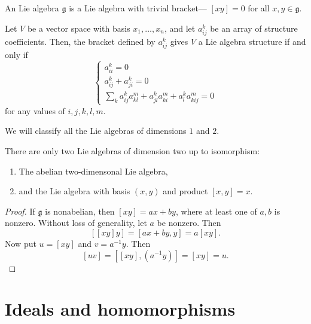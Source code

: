 \documentclass{article}
\newcommand{\lb}[1]{\ensuremath{\left[{#1}\right]}}
\newcommand*\frkg{{\ensuremath{\mathfrak{g}}}}
\begin{document}
\begin{definition}
    An  Lie algebra $\frkg$ is a Lie algebra with trivial bracket--- $\lb{xy} = 0$ for all $x,y \in \frkg$.
\end{definition}

\begin{proposition}
    Let $V$ be a vector space with basis $x_1,\ldots,x_n$, and let $a_{ij}^k$ be an array of structure coefficients.
    Then, the bracket defined by $a_{ij}^k$ gives $V$ a Lie algebra structure if and only if
    \[
        \begin{cases}
            a_{ii}^k = 0 \\
            a_{ij}^k + a_{ji}^k = 0 \\
            \sum_k
            a_{ij}^ka_{kl}^m
            + a_{jl}^ka_{ki}^m
            + a_{l}^ka_{kij}^m
            =
            0
        \end{cases}
    \]
    for any values of $i,j,k,l,m$.
\end{proposition}

We will classify all the Lie algebras of dimensions $1$ and $2$.

\begin{proposition}
    There are only two Lie algebras of dimension two up to isomorphism:
    \begin{enumerate}[label=(\alph*)]
        \item 
            The abelian two-dimensonal Lie algebra,
        \item 
            and the Lie algebra with basis $(x,y)$ and product $[x,y] = x$.
    \end{enumerate}
\end{proposition}

\begin{proof}
    If $\frkg$ is nonabelian, then $\lb{xy} = ax + by$, where at least one of $a, b$ is nonzero.
    Without loss of generality, let $a$ be nonzero.
    Then
    \[
        \lb{\lb{xy}y}
        =
        \lb{ax + by,y}
        =
        a\lb{xy}.
    \]
    Now put $u = \lb{xy}$ and $v = a^{-1}y$.
    Then
    \[
        \lb{uv}
        =
        \lb{\lb{xy},(a^{-1}y)}
        =
        \lb{xy}
        =
        u.
    \]
\end{proof}

\section{Ideals and homomorphisms}
\end{document}
